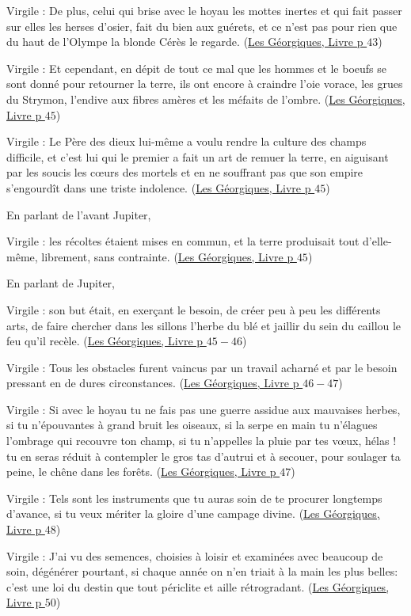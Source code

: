 \documentclass[a4paper, 11pt, hidelinks]{article}
\newcommand{\bs}{\bigskip}
\newcommand{\rb}[1]{\Romanbar{#1}}
\newcommand{\citer}[3]{\bs \begin{center} \textcolor{authorGray}{#1 :} \textcolor{citationRed}{\og #2 \fg} \textcolor{authorGray}{(\underline{#3})} \end{center} \bs}
\begin{document}
\citer{Virgile}{De plus, celui qui brise avec le hoyau les mottes inertes et qui fait passer sur elles les herses d'osier, fait
du bien aux guérets, et ce n'est pas pour rien que du haut de l'Olympe la blonde Cérès le regarde.}{Les Géorgiques, Livre \rb{1} p $43$}


\citer{Virgile}{Et cependant, en dépit de tout ce mal que les hommes et le boeufs se sont donné pour retourner la terre, ils ont encore 
à craindre l'oie vorace, les grues du Strymon, l'endive aux fibres amères et les méfaits de l'ombre.}{Les Géorgiques, Livre \rb{1} p $45$}


\citer{Virgile}{Le Père des dieux lui-même a voulu rendre la culture des champs difficile, et c'est lui qui le premier a fait un art 
de remuer la terre, en aiguisant par les soucis les c\oe urs des mortels et en ne souffrant pas que son empire s'engourdît dans une 
triste indolence.}{Les Géorgiques, Livre \rb{1} p $45$}


En parlant de l'avant Jupiter, \citer{Virgile}{les récoltes étaient mises en commun, et la terre produisait tout d'elle-même, 
librement, sans contrainte.}{Les Géorgiques, Livre \rb{1} p $45$}


En parlant de Jupiter, \citer{Virgile}{son but était, en exerçant le besoin, de créer peu à peu les différents arts, de faire 
chercher dans les sillons l'herbe du blé et jaillir du sein du caillou le feu qu'il recèle.}{Les Géorgiques, Livre \rb{1} p $45-46$}


\citer{Virgile}{Tous les obstacles furent vaincus par un travail acharné et par le besoin pressant en de dures circonstances.}{Les Géorgiques, Livre \rb{1} p $46-47$}


\citer{Virgile}{Si avec le hoyau tu ne fais pas une guerre assidue aux mauvaises herbes, si tu n'épouvantes à grand bruit
les oiseaux, si la serpe en main tu n'élagues l'ombrage qui recouvre ton champ, si tu n'appelles la pluie par tes v\oe ux, hélas ! 
tu en seras réduit à contempler le gros tas d'autrui et à secouer, pour soulager ta peine, le chêne dans les forêts.}{Les Géorgiques, Livre \rb{1} p $47$}


\citer{Virgile}{Tels sont les instruments que tu auras soin de te procurer longtemps d'avance, si tu veux mériter la gloire 
d'une campage divine.}{Les Géorgiques, Livre \rb{1} p $48$}


\citer{Virgile}{J'ai vu des semences, choisies à loisir et examinées avec beaucoup de soin, dégénérer pourtant, si chaque année 
on n'en triait à la main les plus belles: c'est une loi du destin que tout périclite et aille rétrogradant.}{Les Géorgiques, Livre \rb{1} p $50$}
\end{document}
